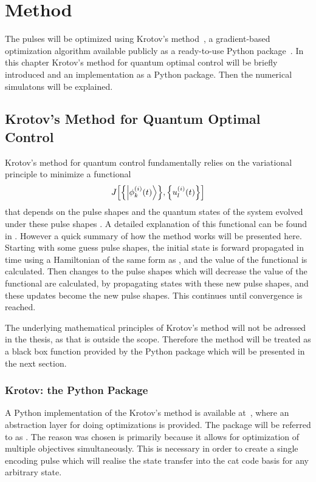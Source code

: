 \documentclass[main.tex]{subfiles}
\begin{document}
\chapter{Method}
The pulses will be optimized using Krotov's method~\cite{reich_monotonically_2012}, a gradient-based optimization algorithm available publicly as a ready-to-use Python package~\cite{goerz_krotov:_2019}.
In this chapter Krotov's method for quantum optimal control will be briefly introduced and an implementation as a Python package.
Then the numerical simulatons will be explained.

\section{Krotov's Method for Quantum Optimal Control}
Krotov's method for quantum control fundamentally relies on the variational principle to minimize a functional
\[ J\qty[\qty{\ket{\phi^{(i)}_k(t)}},\qty{u_l^{(i)}(t)}] \]
that depends on the pulse shapes and the quantum states of the system evolved under these pulse shapes \cite{goerz_krotov:_2019}.
A detailed explanation of this functional can be found in \cite{reich_monotonically_2012}.
However a quick summary of how the method works will be presented here.
Starting with some guess pulse shapes, the initial state is forward propagated in time using a Hamiltonian of the same form as , and the value of the functional is calculated.
Then changes to the pulse shapes which will decrease the value of the functional are calculated, by propagating states with these new pulse shapes, and these updates become the new pulse shapes.
This continues until convergence is reached.

The underlying mathematical principles of Krotov's method will not be adressed in the thesis, as that is outside the scope.
Therefore the method will be treated as a black box function provided by the Python package which will be presented in the next section.

\subsection{Krotov: the Python Package}
A Python implementation of the Krotov's method is available at~\cite{goerz_krotov:_2019}, where an abstraction layer for doing optimizations is provided.
The package will be referred to as \krotov{}.
The reason \krotov{} was chosen is primarily because it allows for optimization of multiple objectives simultaneously.
This is necessary in order to create a single encoding pulse which will realise the state transfer into the cat code basis for any arbitrary state.
\end{document}
